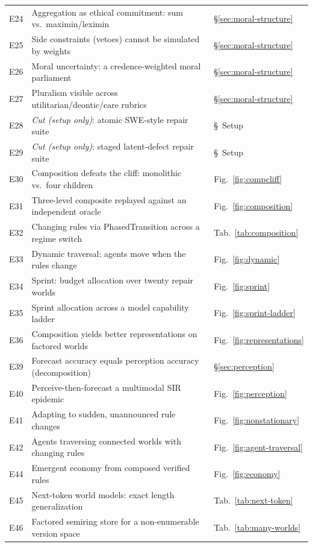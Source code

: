 \documentclass[11pt]{article}
\begin{document}
\begin{longtable}{@{}r p{} l@{}}
E24 & Aggregation as ethical commitment: sum vs.\ maximin/leximin & \S\ref{sec:moral-structure} \\
E25 & Side constraints (vetoes) cannot be simulated by weights & \S\ref{sec:moral-structure} \\
E26 & Moral uncertainty: a credence-weighted moral parliament & \S\ref{sec:moral-structure} \\
E27 & Pluralism visible across utilitarian/deontic/care rubrics & \S\ref{sec:moral-structure} \\
E28 & \emph{Cut (setup only)}: atomic SWE-style repair suite & \S~Setup \\
E29 & \emph{Cut (setup only)}: staged latent-defect repair suite & \S~Setup \\
E30 & Composition defeats the cliff: monolithic vs.\ four children & Fig.~\ref{fig:compcliff} \\
E31 & Three-level composite replayed against an independent oracle & Fig.~\ref{fig:composition} \\
E32 & Changing rules via PhasedTransition across a regime switch & Tab.~\ref{tab:composition} \\
E33 & Dynamic traversal: agents move when the rules change & Fig.~\ref{fig:dynamic} \\
E34 & Sprint: budget allocation over twenty repair worlds & Fig.~\ref{fig:sprint} \\
E35 & Sprint allocation across a model capability ladder & Fig.~\ref{fig:sprint-ladder} \\
E36 & Composition yields better representations on factored worlds & Fig.~\ref{fig:representations} \\
E39 & Forecast accuracy equals perception accuracy (decomposition) & \S\ref{sec:perception} \\
E40 & Perceive-then-forecast a multimodal SIR epidemic & Fig.~\ref{fig:perception} \\
E41 & Adapting to sudden, unannounced rule changes & Fig.~\ref{fig:nonstationary} \\
E42 & Agents traversing connected worlds with changing rules & Fig.~\ref{fig:agent-traversal} \\
E44 & Emergent economy from composed verified rules & Fig.~\ref{fig:economy} \\
E45 & Next-token world models: exact length generalization & Tab.~\ref{tab:next-token} \\
E46 & Factored semiring store for a non-enumerable version space & Tab.~\ref{tab:many-worlds} \\

\end{longtable}
\end{document}
